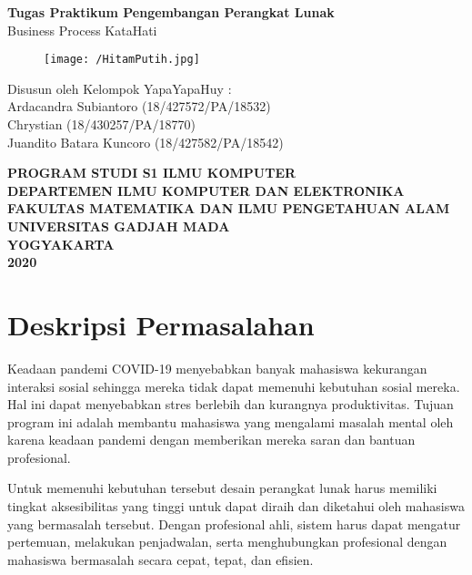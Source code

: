 \documentclass{article}
\begin{document}
	\begin{titlepage}
		\begin{center}
			
			\null
			{
				\huge \bfseries Tugas Praktikum Pengembangan Perangkat Lunak}\\
			[1cm]
			{\LARGE Business Process KataHati}\\
			
			\vspace{2cm}
			
			\begin{figure}[H]
				\centering
				\texttt{[image: /HitamPutih.jpg]}
			\end{figure}
			
			\vspace{3cm}
			
			{\Large 
				Disusun oleh Kelompok YapaYapaHuy} {\Large :\\
				\vspace{0.5cm}
				Ardacandra Subiantoro (18/427572/PA/18532)\\
				Chrystian (18/430257/PA/18770)\\
				Juandito Batara Kuncoro (18/427582/PA/18542)\\
			}
			
			
			\vspace{2cm}
			
			{\normalsize \bfseries
				PROGRAM STUDI S1 ILMU KOMPUTER\\
				DEPARTEMEN ILMU KOMPUTER DAN ELEKTRONIKA\\
				FAKULTAS MATEMATIKA DAN ILMU PENGETAHUAN ALAM\\
				UNIVERSITAS GADJAH MADA\\
				YOGYAKARTA\\
				\vspace{0.2cm}
				2020
			}
			
		\end{center}
	\end{titlepage}

	\newpage
	
	\section{Deskripsi Permasalahan}
	\par
	Keadaan pandemi COVID-19 menyebabkan banyak mahasiswa kekurangan interaksi sosial sehingga mereka tidak dapat memenuhi kebutuhan sosial mereka. Hal ini dapat menyebabkan stres berlebih dan kurangnya produktivitas. Tujuan program ini adalah membantu mahasiswa yang mengalami masalah mental oleh karena keadaan pandemi dengan memberikan mereka saran dan bantuan profesional.
	\par
	Untuk memenuhi kebutuhan tersebut desain perangkat lunak harus memiliki tingkat aksesibilitas yang tinggi untuk dapat diraih dan diketahui oleh mahasiswa yang bermasalah tersebut. Dengan profesional ahli, sistem harus dapat mengatur pertemuan, melakukan penjadwalan, serta menghubungkan profesional dengan mahasiswa bermasalah secara cepat, tepat, dan efisien.
	
\end{document}
